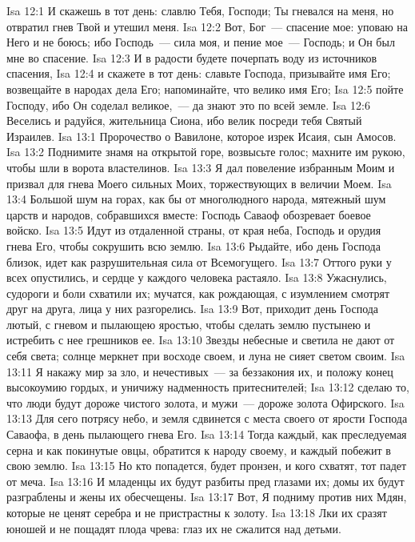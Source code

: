 \vs Isa 12:1 И скажешь в тот день: славлю Тебя, Господи; Ты гневался на меня, но отвратил гнев Твой и утешил меня.
\vs Isa 12:2 Вот, Бог~--- спасение мое: уповаю на Него и не боюсь; ибо Господь~--- сила моя, и пение мое~--- Господь; и Он был мне во спасение.
\vs Isa 12:3 И в радости будете почерпать воду из источников спасения,
\vs Isa 12:4 и скажете в тот день: славьте Господа, призывайте имя Его; возвещайте в народах дела Его; напоминайте, что велико имя Его;
\vs Isa 12:5 пойте Господу, ибо Он соделал великое,~--- да знают это по всей земле.
\vs Isa 12:6 Веселись и радуйся, жительница Сиона, ибо велик посреди тебя Святый Израилев.
\vs Isa 13:1 Пророчество о Вавилоне, которое изрек Исаия, сын Амосов.
\vs Isa 13:2 Поднимите знамя на открытой горе, возвысьте голос; махните им рукою, чтобы шли в ворота властелинов.
\vs Isa 13:3 Я дал повеление избранным Моим и призвал для  гнева Моего сильных Моих, торжествующих в величии Моем.
\vs Isa 13:4 Большой шум на горах, как бы от многолюдного народа, мятежный шум царств и народов, собравшихся вместе: Господь Саваоф обозревает боевое войско.
\vs Isa 13:5 Идут из отдаленной страны, от края неба, Господь и орудия гнева Его, чтобы сокрушить всю землю.
\vs Isa 13:6 Рыдайте, ибо день Господа близок, идет как разрушительная сила от Всемогущего.
\vs Isa 13:7 Оттого руки у всех опустились, и сердце у каждого человека растаяло.
\vs Isa 13:8 Ужаснулись, судороги и боли схватили их; мучатся, как рождающая, с изумлением смотрят друг на друга, лица у них разгорелись.
\vs Isa 13:9 Вот, приходит день Господа лютый, с гневом и пылающею яростью, чтобы сделать землю пустынею и истребить с нее грешников ее.
\vs Isa 13:10 Звезды небесные и светила не дают от себя света; солнце меркнет при восходе своем, и луна не сияет светом своим.
\vs Isa 13:11 Я накажу мир за зло, и нечестивых~--- за беззакония их, и положу конец высокоумию гордых, и уничижу надменность притеснителей;
\vs Isa 13:12 сделаю то, что люди будут дороже чистого золота, и мужи~--- дороже золота Офирского.
\vs Isa 13:13 Для сего потрясу небо, и земля сдвинется с места своего от ярости Господа Саваофа, в день пылающего гнева Его.
\vs Isa 13:14 Тогда каждый, как преследуемая серна и как покинутые овцы, обратится к народу своему, и каждый побежит в свою землю.
\vs Isa 13:15 Но кто попадется, будет пронзен, и кого схватят, тот падет от меча.
\vs Isa 13:16 И младенцы их будут разбиты пред глазами их; домы их будут разграблены и жены их обесчещены.
\vs Isa 13:17 Вот, Я подниму против них Мдян, которые не ценят серебра и не пристрастны к золоту.
\vs Isa 13:18 Лки их сразят юношей и не пощадят плода чрева: глаз их не сжалится над детьми.
